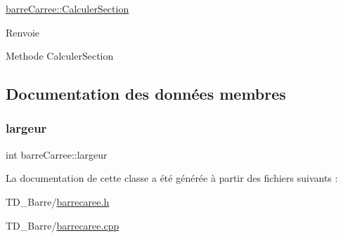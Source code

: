 \hyperlink{classbarre_carree_ab7965489abcbac7f9e7d108f801c95e0}{barre\+Carree\+::\+Calculer\+Section} 

\begin{DoxyReturn}{Renvoie}

\end{DoxyReturn}
Methode Calculer\+Section 

\subsection{Documentation des données membres}
\mbox{\label{classbarre_carree_ad2090886607c393f6222239f3efaff0d}} 
\subsubsection{\texorpdfstring{largeur}{largeur}}
{\footnotesize\ttfamily int barre\+Carree\+::largeur\hspace{0.3cm}{\ttfamily [private]}}



La documentation de cette classe a été générée à partir des fichiers suivants \+:\begin{DoxyCompactItemize}
\item 
T\+D\+\_\+\+Barre/\hyperlink{barrecaree_8h}{barrecaree.\+h}\item 
T\+D\+\_\+\+Barre/\hyperlink{barrecaree_8cpp}{barrecaree.\+cpp}\end{DoxyCompactItemize}

